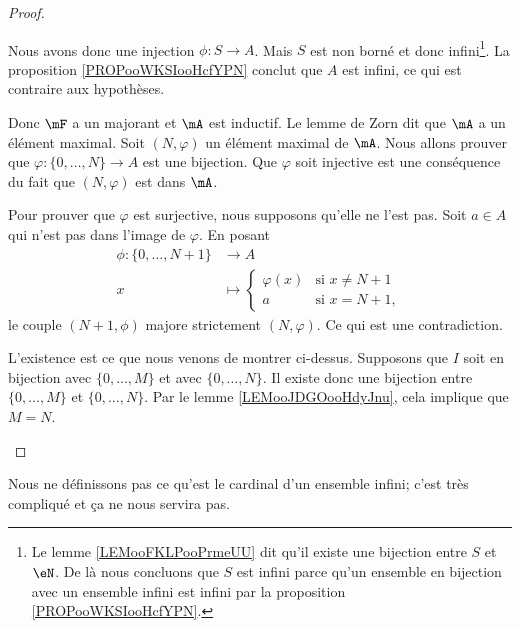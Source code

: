 \begin{proof}
\begin{subproof}
\begin{subproof}
			Nous avons donc une injection \( \phi\colon S\to A\). Mais \( S\) est non borné et donc infini\footnote{Le lemme \ref{LEMooFKLPooPrmeUU} dit qu'il existe une bijection entre \( S\) et \( \eN\). De là nous concluons que \( S\) est infini parce qu'un ensemble en bijection avec un ensemble infini est infini par la proposition \ref{PROPooWKSIooHcfYPN}.}. La proposition \ref{PROPooWKSIooHcfYPN} conclut que \( A\) est infini, ce qui est contraire aux hypothèses.

			Donc \( \mF\) a un majorant et \( \mA\) est inductif.
			Le lemme de Zorn dit que \( \mA\) a un élément maximal.
			\spitem[Conclusion]
			Soit \( (N,\varphi)\) un élément maximal de \( \mA\). Nous allons prouver que \( \varphi\colon \{ 0,\ldots, N \}\to A\) est une bijection. Que \( \varphi\) soit injective est une conséquence du fait que \( (N,\varphi)\) est dans \( \mA\).

			Pour prouver que \( \varphi\) est surjective, nous supposons qu'elle ne l'est pas. Soit \( a\in A\) qui n'est pas dans l'image de \( \varphi\). En posant
			\begin{equation}
				\begin{aligned}
					\phi\colon \{ 0,\ldots, N+1 \} & \to A                                     \\
					x                              & \mapsto \begin{cases}
						                                         \varphi(x) & \text{si } x\neq N+1 \\
						                                         a          & \text{si } x=N+1,
					                                         \end{cases}
				\end{aligned}
			\end{equation}
			le couple \( (N+1,\phi)\) majore strictement \( (N,\varphi)\). Ce qui est une contradiction.
		\end{subproof}
		L'existence est ce que nous venons de montrer ci-dessus.
		Supposons que \( I\) soit en bijection avec \( \{ 0,\ldots, M \}\) et avec \( \{ 0,\ldots,N \}\). Il existe donc une bijection entre \(  \{ 0,\ldots, M \}\) et \( \{ 0,\ldots, N \}\). Par le lemme \ref{LEMooJDGOooHdyJnu}, cela implique que \( M=N\).
	\end{subproof}
\end{proof}
Nous ne définissons pas ce qu'est le cardinal d'un ensemble infini; c'est très compliqué et ça ne nous servira pas.


